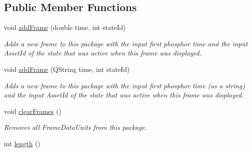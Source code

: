 \subsection*{Public Member Functions}
\begin{DoxyCompactItemize}
\item 
\hypertarget{class_picto_1_1_frame_data_unit_package_a39ff4197afeab2e5e2e87d5510b2b693}{void \hyperlink{class_picto_1_1_frame_data_unit_package_a39ff4197afeab2e5e2e87d5510b2b693}{add\-Frame} (double time, int state\-Id)}\label{class_picto_1_1_frame_data_unit_package_a39ff4197afeab2e5e2e87d5510b2b693}

\begin{DoxyCompactList}\small\item\em Adds a new frame to this package with the input first phosphor time and the input Asset\-Id of the state that was active when this frame was displayed. \end{DoxyCompactList}\item 
\hypertarget{class_picto_1_1_frame_data_unit_package_afb3c12cc5772538c3c5e35cbd53601bd}{void \hyperlink{class_picto_1_1_frame_data_unit_package_afb3c12cc5772538c3c5e35cbd53601bd}{add\-Frame} (Q\-String time, int state\-Id)}\label{class_picto_1_1_frame_data_unit_package_afb3c12cc5772538c3c5e35cbd53601bd}

\begin{DoxyCompactList}\small\item\em Adds a new frame to this package with the input first phosphor time (as a string) and the input Asset\-Id of the state that was active when this frame was displayed. \end{DoxyCompactList}\item 
\hypertarget{class_picto_1_1_frame_data_unit_package_aefa5ee3504ba041ea09542121d0ec108}{void \hyperlink{class_picto_1_1_frame_data_unit_package_aefa5ee3504ba041ea09542121d0ec108}{clear\-Frames} ()}\label{class_picto_1_1_frame_data_unit_package_aefa5ee3504ba041ea09542121d0ec108}

\begin{DoxyCompactList}\small\item\em Removes all Frame\-Data\-Units from this package. \end{DoxyCompactList}\item 
\hypertarget{class_picto_1_1_frame_data_unit_package_abddf213764da4201b6ac99993563c75b}{int \hyperlink{class_picto_1_1_frame_data_unit_package_abddf213764da4201b6ac99993563c75b}{length} ()}\label{class_picto_1_1_frame_data_unit_package_abddf213764da4201b6ac99993563c75b}


\end{DoxyCompactItemize}

